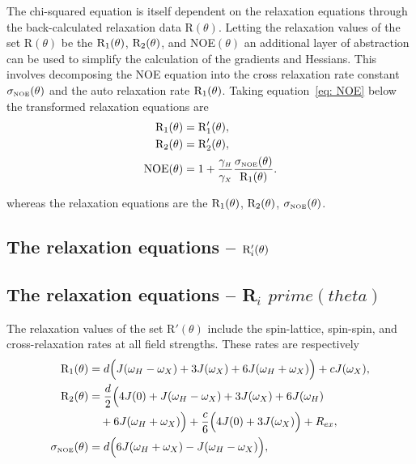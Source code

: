 \begin{htmlonly}
\begin{htmlonly}
The chi-squared equation is itself dependent on the relaxation equations through the back-calculated relaxation data R$(\theta)$.  Letting the relaxation values of the set R$(\theta)$ be the $\mathrm{R}_1(\theta)$, $\mathrm{R}_2(\theta)$, and NOE$(\theta)$ an additional layer of abstraction can be used to simplify the calculation of the gradients and Hessians.  This involves decomposing the NOE equation into the cross relaxation rate constant $\sigma_{\scriptscriptstyle \mathrm{NOE}}(\theta)$ and the auto relaxation rate $\mathrm{R}_1(\theta)$.  Taking equation~\eqref{eq: NOE} below the transformed relaxation equations are
\begin{subequations}
\begin{align}
    \mathrm{R}_1(\theta) &= \mathrm{R}_1'(\theta), \\
    \mathrm{R}_2(\theta) &= \mathrm{R}_2'(\theta), \\
    \mathrm{NOE}(\theta)  &= 1 + \frac{\gamma_{\scriptscriptstyle H}}{\gamma_{\scriptscriptstyle X}} \frac{\sigma_{\scriptscriptstyle \mathrm{NOE}}(\theta)}{\mathrm{R}_1(\theta)}.
\end{align}
\end{subequations}

\noindent whereas the relaxation equations are the $\mathrm{R}_1(\theta)$, $\mathrm{R}_2(\theta)$, $\sigma_{\scriptscriptstyle \mathrm{NOE}}(\theta)$.



\begin{latexonly}
    \subsection{The relaxation equations -- $\mathrm{R}_i'(\theta)$}
\end{latexonly}
\begin{htmlonly}
    \subsection{The relaxation equations -- R$_i$ $prime(theta)$}
\end{htmlonly}

The relaxation values of the set R$'(\theta)$ include the spin-lattice, spin-spin, and cross-relaxation rates at all field strengths.  These rates are respectively \citep{Abragam61}
\begin{subequations}
\begin{align}
    \mathrm{R}_1(\theta) &= d \Big( J(\omega_H - \omega_X) + 3J(\omega_X) + 6J(\omega_H + \omega_X) \Big) + cJ(\omega_X),     \label{eq: R1} \\
    \mathrm{R}_2(\theta) &= \frac{d}{2} \Big( 4J(0) + J(\omega_H - \omega_X) + 3J(\omega_X) + 6J(\omega_H)                    \nonumber \\
        & \quad + 6J(\omega_H + \omega_X) \Big) + \frac{c}{6} \Big( 4J(0) + 3J(\omega_X) \Big) + R_{ex},              \label{eq: R2} \\  
    \sigma_{\scriptscriptstyle \mathrm{NOE}}(\theta) &= d \Big( 6J(\omega_H + \omega_X) - J(\omega_H - \omega_X) \Big),                              \label{eq: sigma_NOE}
\end{align}
\end{subequations}


\end{htmlonly}
\end{htmlonly}
